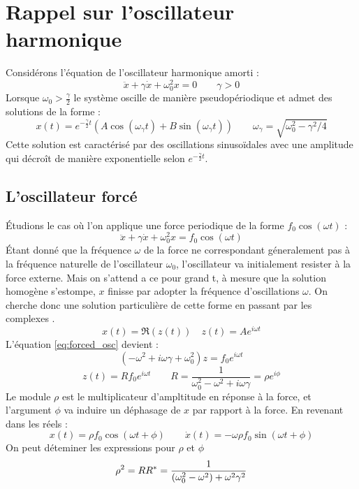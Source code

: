 \chapter{Rappel sur l'oscillateur harmonique}
%
Considérons l'équation de l'oscillateur harmonique amorti :
\begin{dmath}
    \ddot{x} + \gamma\dot{x} + \omega_0^2 x = 0
    \qquad {\gamma > 0}
\end{dmath}   
%
Lorsque $\omega_0 > \frac{\gamma}{2}$ le système oscille de manière pseudopériodique et admet des solutions de la forme :
%
\begin{dmath}
    x(t) = e^{-\frac{\gamma}{2}t}(A\cos(\omega_{\gamma} t) + B\sin(\omega_{\gamma} t))
    \qquad {\omega_{\gamma} = \sqrt{\omega_0^2 - \gamma^2/4}}
\end{dmath}
%
Cette solution est caractérisé par des oscillations sinusoïdales avec une amplitude qui décroît de manière exponentielle selon $e^{-\frac{\gamma}{2} t}$.
%
\section{L'oscillateur forcé}
%
Étudions le cas où l’on applique une force periodique de la forme $f_0\cos(\omega t)$ :
%
\begin{dmath}
    \ddot{x} + \gamma\dot{x} + \omega_0^2 x = f_0\cos(\omega t)
    \label{eq:forced_osc}
\end{dmath}
%
Étant donné que la fréquence $\omega$ de la force ne correspondant 
géneralement pas à la fréquence naturelle de l'oscillateur $\omega_0$, 
l'oscillateur va initialement resister à la force externe.
Mais on s'attend a ce pour grand t, à mesure que la solution homogène s'estompe, $x$ finisse par adopter la 
fréquence d'oscillations $\omega$. 
On cherche donc une solution particulière de cette forme en passant 
par les complexes \cite{feynman_feynman_nodate}.
%
\begin{equation}
    x(t) = \Re(z(t)) \quad z(t) = Ae^{i\omega t}
\end{equation}
%
L'équation \eqref{eq:forced_osc} devient :
%
\begin{equation}
    (-\omega^2 + i\omega\gamma + \omega_0^2)z = f_0 e^{i\omega t}
\end{equation}
%
\begin{equation}
    z(t) = R f_0 e^{i \omega t} \qquad R = \frac{1}{\omega_0^2 - \omega^2 + i\omega\gamma} = \rho e^{i\phi}
\end{equation}
%
Le module $\rho$ est le multiplicateur d’ampltitude en réponse à la force, et l’argument $\phi$ va induire un déphasage de $x$ par rapport à la force.
%
En revenant dans les réels :
\begin{equation}
    x(t) = \rho f_0 \cos(\omega t + \phi)
    \qquad \dot{x}(t) = -\omega \rho f_0 \sin(\omega t + \phi)
\end{equation}
%
On peut déteminer les expressions pour $\rho$ et $\phi$
%
\begin{dmath}
    \rho^2 = RR^* \\
    = \frac{1}{(\omega_0^2 - \omega^2) + \omega^2\gamma^2}
\end{dmath}

